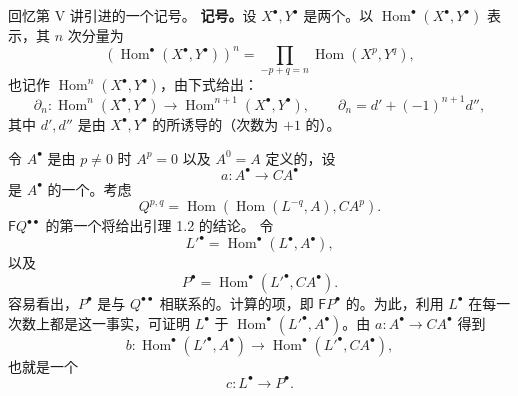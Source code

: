 回忆第 V 讲引进的一个记号。
\textbf{记号。}设 $X^{\bullet},Y^{\bullet}$ 是两个。以 $\operatorname{Hom}^{\bullet}(X^{\bullet},Y^{\bullet})$ 表示，其 $n$ 次分量为
\[(\operatorname{Hom}^{\bullet}(X^{\bullet},Y^{\bullet}))^n
=\prod_{-p+q=n}\operatorname{Hom}(X^p,Y^q),\]
也记作 $\operatorname{Hom}^n(X^{\bullet},Y^{\bullet})$，由下式给出：
\[
\partial_n:\operatorname{Hom}^n(X^{\bullet},Y^{\bullet})\longrightarrow
\operatorname{Hom}^{n+1}(X^{\bullet},Y^{\bullet}),\qquad
\partial_n=d'+(-1)^{n+1}d'',
\]
其中 $d',d''$ 是由 $X^{\bullet},Y^{\bullet}$ 的所诱导的（次数为 $+1$ 的）。

令 $A^{\bullet}$ 是由 $p\neq0$ 时 $A^p=0$ 以及 $A^0=A$ 定义的，设
\[a:A^{\bullet}\longrightarrow CA^{\bullet}\]
是 $A^{\bullet}$ 的一个。考虑
\[Q^{p,q}=\operatorname{Hom}(\operatorname{Hom}(L^{-q},A),CA^p).\tag{1.2}\]
 $\mathsf FQ^{\bullet\bullet}$ 的第一个将给出引理 1.2 的结论。
令
\[L'^{\bullet}=\operatorname{Hom}^{\bullet}(L^{\bullet},A^{\bullet}),\tag{1.3}\]
以及
\[P^{\bullet}=\operatorname{Hom}^{\bullet}(L'^{\bullet},CA^{\bullet}).\tag{1.4}\]
容易看出，$P^{\bullet}$ 是与 $Q^{\bullet\bullet}$ 相联系的。计算的项，即 $\mathsf FP^{\bullet}$ 的。为此，利用 $L^{\bullet}$ 在每一次数上都是这一事实，可证明 $L^{\bullet}$ 于 $\operatorname{Hom}^{\bullet}(L'^{\bullet},A^{\bullet})$。由 $a:A^{\bullet}\to CA^{\bullet}$ 得到
\[b:\operatorname{Hom}^{\bullet}(L'^{\bullet},A^{\bullet})\longrightarrow
\operatorname{Hom}^{\bullet}(L'^{\bullet},CA^{\bullet}),\]
也就是一个
\[c:L^{\bullet}\longrightarrow P^{\bullet}.\tag{1.5}\]
